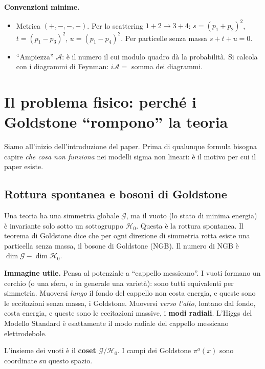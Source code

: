 \documentclass[11pt,a4paper]{article}
\numberwithin{equation}{section}
\theoremstyle{remark}
\newcommand{\G}{\mathcal{G}}
\newcommand{\Hg}{\mathcal{H}_0}
\begin{document}
\textbf{Convenzioni minime.}
\begin{itemize}[nosep]
\item Metrica $(+,-,-,-)$. Per lo scattering $1+2\to3+4$: $s=(p_1+p_2)^2$, $t=(p_1-p_3)^2$, $u=(p_1-p_4)^2$. Per particelle senza massa $s+t+u=0$.
\item ``Ampiezza'' $\mathcal A$: è il numero il cui modulo quadro dà la probabilità. Si calcola con i diagrammi di Feynman: $i\mathcal A=$ somma dei diagrammi.
\end{itemize}

\section{Il problema fisico: perché i Goldstone ``rompono'' la teoria}
\label{cap:problema}

\begin{dove}
Siamo all'inizio dell'introduzione del paper. Prima di qualunque formula bisogna capire \emph{che cosa non funziona} nei modelli sigma non lineari: è il motivo per cui il paper esiste.
\end{dove}

\subsection{Rottura spontanea e bosoni di Goldstone}

Una teoria ha una simmetria globale $\G$, ma il vuoto (lo stato di minima energia) è invariante solo sotto un sottogruppo $\Hg$. Questa è la rottura spontanea. Il teorema di Goldstone dice che per ogni direzione di simmetria rotta esiste una particella senza massa, il bosone di Goldstone (NGB). Il numero di NGB è $\dim\G-\dim\Hg$.

\textbf{Immagine utile.} Pensa al potenziale a ``cappello messicano''. I vuoti formano un cerchio (o una sfera, o in generale una varietà): sono tutti equivalenti per simmetria. Muoversi \emph{lungo} il fondo del cappello non costa energia, e queste sono le eccitazioni senza massa, i Goldstone. Muoversi \emph{verso l'alto}, lontano dal fondo, costa energia, e queste sono le eccitazioni massive, i \textbf{modi radiali}. L'Higgs del Modello Standard è esattamente il modo radiale del cappello messicano elettrodebole.

L'insieme dei vuoti è il \textbf{coset} $\G/\Hg$. I campi dei Goldstone $\pi^a(x)$ sono coordinate su questo spazio.
\end{document}
